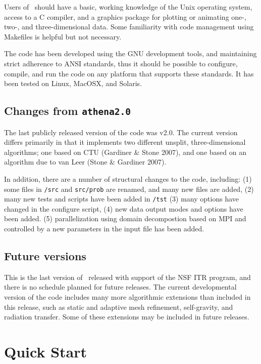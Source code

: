 Users of \ath\ should have a basic, working knowledge of the Unix
operating system, access to a C compiler, and a graphics package for
plotting or animating one-, two-, and three-dimensional data.  Some familiarity
with code management using Makefiles is helpful but not necessary.

The code has been developed using the GNU development tools, and
maintaining strict adherence to ANSI standards, thus it should be possible
to configure, compile, and run the code on any platform that supports these
standards.  It has been tested on Linux, MacOSX, and Solaris.

\subsection{Changes from {\tt athena2.0}}

The last publicly released version of the code was v2.0.  The current version
differs primarily in that it implements two different unsplit, three-dimensional
algorithms; one based on CTU (Gardiner \& Stone 2007), and one based on an algorithm due to 
van Leer (Stone \& Gardiner 2007).  

In addition, there are a number of structural changes to the code, including:
(1) some files in {\tt /src} and {\tt src/prob} are renamed, and many new files are added,
(2) many new tests and scripts have been added in {\tt /tst}
(3) many options have changed in the configure script,
(4) new data output modes and options have been added.
(5) parallelization using domain decompostion based on MPI and controlled
by a new parameters in the input file has been added.

\subsection{Future versions}

This is the last version of \ath\ released with support of the NSF
ITR program, and there is no schedule planned for future releases.
The current developmental version of the code includes many more
algorithmic extensions than included in this release, such as static and
adaptive mesh refinement, self-gravity, and radiation transfer.
Some of these extensions may be included in future releases.

\section{Quick Start}

